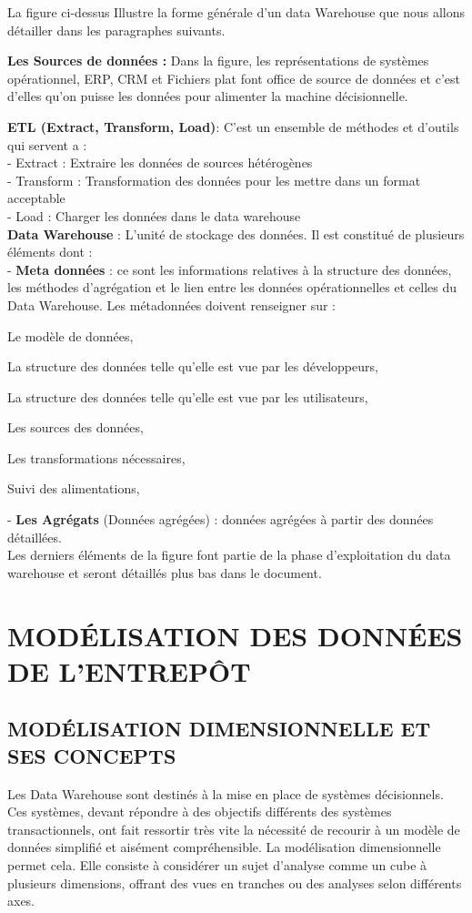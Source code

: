 La figure ci-dessus Illustre la forme générale d’un data Warehouse que nous allons détailler dans les paragraphes suivants.

\textbf{Les Sources de données :} Dans la figure, les représentations de systèmes opérationnel, ERP, CRM et Fichiers plat font office de source de données et c’est d’elles qu’on puisse les données pour alimenter la machine décisionnelle.

\textbf{ETL (Extract, Transform, Load)}: C’est un ensemble de méthodes et d’outils qui servent a :\\
-	Extract : Extraire les données de sources hétérogènes\\
-	Transform : Transformation des données pour les mettre dans un format acceptable\\
-	Load : Charger les données dans le data warehouse\\

\textbf{Data Warehouse} : L’unité de stockage des données. Il est constitué de plusieurs éléments dont :\\ 
-	\textbf{Meta données} : ce sont les informations relatives à la structure des données, les méthodes d’agrégation et le lien entre les données opérationnelles et celles du Data Warehouse. Les métadonnées doivent renseigner sur :
 \begin{description}
 \item Le modèle de données,
 \item La structure des données telle qu’elle est vue par les développeurs,
 \item La structure des données telle qu’elle est vue par les utilisateurs,
 \item Les sources des données,
 \item Les transformations nécessaires,
 \item Suivi des alimentations,
 \end{description}
-	\textbf{Les Agrégats} (Données agrégées) : données agrégées à partir des données détaillées.\\

Les derniers éléments de la figure font partie de la phase d’exploitation du data warehouse et seront détaillés plus bas dans le document.


\section{MODÉLISATION DES DONNÉES DE L'ENTREPÔT}

 \subsection{MODÉLISATION DIMENSIONNELLE ET SES CONCEPTS}
 	Les Data Warehouse sont destinés à la mise en place de systèmes décisionnels. Ces systèmes, devant répondre à des objectifs différents des systèmes transactionnels, ont fait ressortir très vite la nécessité de recourir à un modèle de données simplifié et aisément compréhensible. La modélisation dimensionnelle permet cela. Elle consiste à considérer un sujet d’analyse comme un cube à plusieurs dimensions, offrant des vues en tranches ou des analyses selon différents axes.
 	
